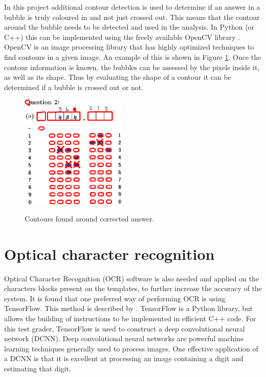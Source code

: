 In this project additional contour detection is used to determine if an answer in a bubble is truly coloured in and not just crossed out. This means that the contour around the bubble needs to be detected and used in the analysis. In Python (or C++) this can be implemented using the freely available OpenCV library \citep{AdrianR2016}. OpenCV is an image processing library that has highly optimized techniques to find contours in a given image. An example of this is shown in Figure \ref{fig:Cross}. Once the contour information is known, the bubbles can be assessed by the pixels inside it, as well as its shape. Thus by evaluating the shape of a contour it can be determined if a bubble is crossed out or not.
\begin{figure}
  \centering
  \includegraphics[width=5cm]{Cross}\\
  \caption{Contours found around corrected answer.}
  \label{fig:Cross}
\end{figure}

\section{Optical character recognition}
Optical Character Recognition (OCR) software is also needed and applied on the characters blocks present on the templates, to further increase the accuracy of the system. It is found that one preferred way of performing OCR is using TensorFlow. This method is described by \citet{Tensor}. TensorFlow is a Python library, but allows the building of instructions to be implemented in ef{f}icient C++ code. For this test grader, TensorFlow is used to construct a deep convolutional neural network (DCNN). Deep convolutional neural networks are powerful machine learning techniques generally used to process images. One effective application of a DCNN is that it is excellent at processing an image containing a digit and estimating that digit.

